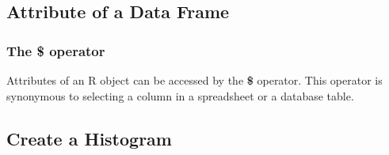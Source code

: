 \documentclass[12pt]{book}\usepackage{knitr}
\begin{document}
\subsection{Attribute of a Data Frame}
\subsubsection{The \textbf{\$} operator}
\noindent Attributes of an R object can be accessed by the \textbf{\$} operator. This operator is synonymous to selecting a column in a spreadsheet or a database table.
\begin{knitrout}
\color{fgcolor}\begin{kframe}
\begin{alltt}
\hlkwb{<-}\hlopt{$} 
\end{alltt}
\end{kframe}
\end{knitrout}
\subsection{Create a Histogram}
\end{document}
